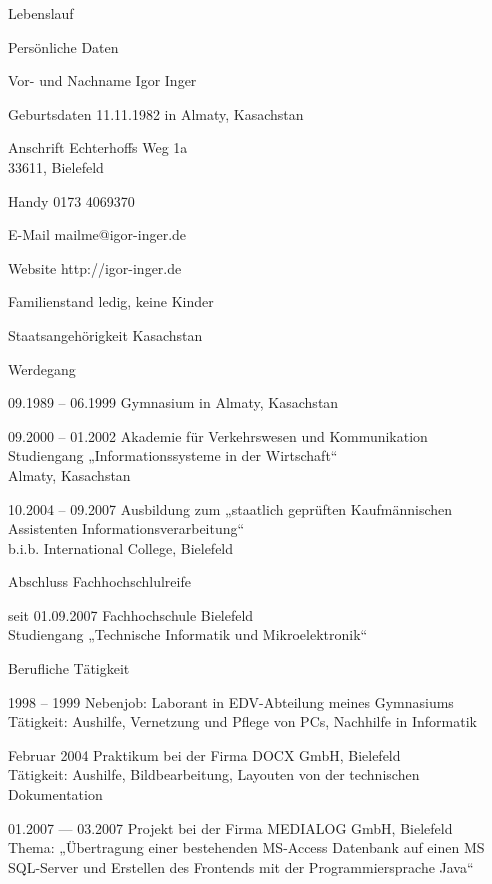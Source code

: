 \documentclass[10pt,a4paper]{scrartcl}
\begin{document}
	\begin{cv}{Lebenslauf}
\setlength{\cvlabelwidth}{12em}
	\begin{cvlist}{Persönliche Daten}
		\item[Vor- und Nachname]
			Igor Inger
		\item[Geburtsdaten]
			11.11.1982 in Almaty, Kasachstan
		\item[Anschrift]
			Echterhoffs Weg 1a\\
			33611, Bielefeld
		\item[Handy]
			0173 4069370
		\item[E-Mail]
			mailme@igor-inger.de
		\item[Website]
			http://igor-inger.de
		\item[Familienstand]
			ledig, keine Kinder
		\item[Staatsangehörigkeit]
			Kasachstan
	\end{cvlist}

	\begin{cvlist}{Werdegang}
		\item[09.1989 -- 06.1999]
			Gymnasium in Almaty, Kasachstan
		\item[09.2000 -- 01.2002]
			Akademie für Verkehrswesen und Kommunikation\\
			Studiengang „Informationssysteme in der Wirtschaft“\\
			Almaty, Kasachstan
		\item[10.2004 -- 09.2007]
			Ausbildung zum „staatlich geprüften Kaufmännischen Assistenten Informationsverarbeitung“\\
			b.i.b. International College, Bielefeld
                \item[Abschluss]
                        Fachhochschlulreife
		\item[seit 01.09.2007]
			Fachhochschule Bielefeld\\
			Studiengang „Technische Informatik und Mikroelektronik“
	\end{cvlist}

	\begin{cvlist}{Berufliche Tätigkeit}
		\item[1998 -- 1999]
			Nebenjob: Laborant in EDV-Abteilung meines Gymnasiums\\
			Tätigkeit: Aushilfe, Vernetzung und Pflege von PCs, Nachhilfe in Informatik
		\item[Februar 2004]
			Praktikum bei der Firma DOCX GmbH, Bielefeld\\
			Tätigkeit: Aushilfe, Bildbearbeitung, Layouten von der technischen Dokumentation
		\item [01.2007 — 03.2007]
			Projekt bei der Firma MEDIALOG GmbH, Bielefeld\\
			Thema: „Übertragung einer bestehenden MS-Access Datenbank auf einen MS SQL-Server und Erstellen des Frontends mit der Programmiersprache Java“
	\end{cvlist}


\end{cv}
\end{document}
